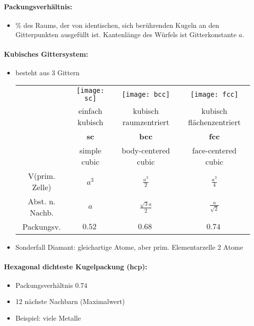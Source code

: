 \documentclass[a4paper,12pt]{article}
\begin{document}
\paragraph*{Packungsverhältnis:}
\begin{itemize}
	\item \% des Raums, der von identischen, sich berührenden Kugeln an den Gitterpunkten ausgefüllt ist. Kantenlänge des Würfels ist Gitterkonstante $ a $.
\end{itemize}
\paragraph*{Kubisches Gittersystem:}
\begin{itemize}
	\item besteht aus 3 Gittern\\
	\hspace*{-2cm}\begin{tabular}{cccc}
		&\texttt{[image: sc]} & \texttt{[image: bcc]} & \texttt{[image: fcc]} \\
		& einfach kubisch & kubisch raumzentriert & kubisch flächenzentriert\\
		&\textbf{sc} & \textbf{bcc} & \textbf{fcc}\\
		& simple cubic & body-centered cubic & face-centered cubic\\
		V(prim. Zelle) & $ a^3 $ & $ \frac{a^3}{2} $ & $ \frac{a^3}{4} $ \\
		Abst. n. Nachb. & $ a $ & $ \frac{\sqrt{3}a}{2} $ & $ \frac{a}{\sqrt{2}} $\\
		Packungsv. & $ \SI{0,52}{} $ & $ \SI{0,68}{} $ & $ \SI{0,74}{} $
	\end{tabular}
	\item Sonderfall Diamant: gleichartige Atome, aber prim. Elementarzelle 2 Atome
\end{itemize}
\paragraph*{Hexagonal dichteste Kugelpackung (hcp):}
\begin{itemize}
	\item Packungsverhältnis $ \SI{0,74}{} $
	\item 12 nächste Nachbarn (Maximalwert)
	\item Beispiel: viele Metalle
\end{itemize}
\end{document}
